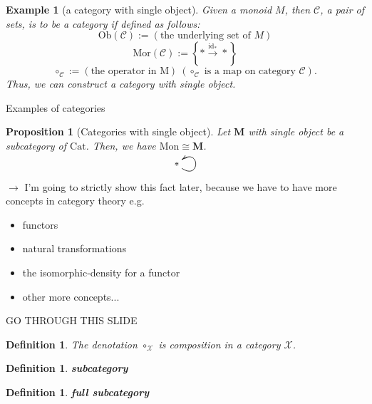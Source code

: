 \documentclass[dvipdfmx,10pt,notheorems]{beamer}
\newtheorem{definition}[theorem]{Definition}
\newtheorem{example}[theorem]{Example}
\newtheorem{proposition}[theorem]{Proposition}
\renewcommand{\#}{^\sharp}
\newcommand{\id}{\mbox{id}}
\begin{document}
	\begin{frame}
			\begin{example}[a category with single object]
							Given a monoid $M$, then $\mathcal{C}$, a pair of sets,
							is to be a category if defined as follows:
							$$
									\mathrm{Ob}(\mathcal{C}):=(\mbox{the underlying set of }M)
							$$
							$$
									\mathrm{Mor}(\mathcal{C}):=\left\{*\overset{\id_{*}}{\rightarrow} *\right\}
							$$
							$$
									\circ_{\mathcal{C}}:=(\mbox{the operator in }\mathrm{M})~
									(\circ_\mathcal{C}\mbox{ is a map on category }\mathcal{C}).
							$$
							Thus, we can construct a category with single object.
			\end{example}
	\end{frame}


	
	\begin{frame}{Examples of categories}
			\begin{proposition}[Categories with single object]
					Let $\mathbf{M}$ with single object be a subcategory of $\mathrm{Cat}$.
					Then, we have $\mathrm{Mon}\cong\mathbf{M}$.
					$$
														\xymatrix{
														\ast
														\ar@(dr,ur)_{}
														}
							$$

			\end{proposition}
			$\rightarrow$ I'm going to strictly show this fact later, because we have to have more concepts in category theory e.g.
			\begin{itemize}
					\item functors
					\item natural transformations
					\item the isomorphic-density for a functor
					\item other more concepts...
			\end{itemize}
	\end{frame}
	
	
	
	\begin{frame}{GO THROUGH THIS SLIDE}
			\begin{definition}
					The denotation $\circ_{\mathcal{X}}$ is composition in a category $\mathcal{X}$.
			\end{definition}
			\begin{definition}
					{\bf subcategory}
			\end{definition}
			\begin{definition}
					{\bf full subcategory}
			\end{definition}
	\end{frame}
	
\end{document}
